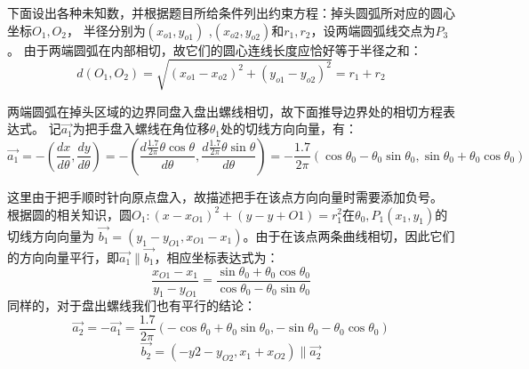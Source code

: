 \documentclass{cumcmthesis1}
\begin{document}
下面设出各种未知数，并根据题目所给条件列出约束方程：掉头圆弧所对应的圆心坐标$O_1,O_2$，
半径分别为$ (x_{o1},y_{o1})$ ,$ (x_{o2},y_{o2})$和$r_1,r_2$，设两端圆弧线交点为$P_3$。
由于两端圆弧在内部相切，故它们的圆心连线长度应恰好等于半径之和：
\begin{equation}
    d(O_1,O_2)=\sqrt{(x_{o1}-x_{o2})^2+(y_{o1}-y_{o2})^2}=r_1+r_2
    \label{eq:distance1}
\end{equation}
\par
两端圆弧在掉头区域的边界同盘入盘出螺线相切，故下面推导边界处的相切方程表达式。
记$\vec{a_1}$为把手盘入螺线在角位移$\theta_1$处的切线方向向量，有：
\begin{equation}
    \vec{a_1}=-(\frac{dx}{d \theta},\frac{dy}{d \theta})=-(\frac{d \frac{1.7}{2 \pi} \theta \cos \theta}{d \theta},\frac{d \frac{1.7}{2 \pi} \theta \sin \theta}{d \theta})
=-\frac{1.7}{ 2 \pi}(\cos \theta_0-\theta_0 \sin \theta_0,\sin \theta_0+\theta_0 \cos \theta_0)
\end{equation}
\par
这里由于把手顺时针向原点盘入，故描述把手在该点方向向量时需要添加负号。
根据圆的相关知识，圆$O_1: (x-x_{O1})^2+(y-y+{O1})=r_1^2$在$\theta_0,P_1(x_1,y_1)$的切线方向向量为
$\vec{b_1}=(y_1-y_{O1},x_{O1}-x_1)$。由于在该点两条曲线相切，因此它们的方向向量平行，即$\vec{a_1} \parallel \vec{b_1}$，相应坐标表达式为：
\begin{equation}
    \frac{x_{O1}-x_1}{y_1-y_{O1}}=\frac{\sin \theta_0+\theta_0 \cos \theta_0}{\cos \theta_0-\theta_0 \sin \theta_0}
    \label{eq:qiexian1}
\end{equation}
同样的，对于盘出螺线我们也有平行的结论：
\begin{equation}
    \vec{a_2}=-\vec{a_1}=\frac{1.7}{ 2 \pi}(-\cos \theta_0+\theta_0 \sin \theta_0,-\sin \theta_0-\theta_0 \cos \theta_0)
\end{equation}
\begin{equation}
   \vec{b_2}=(-y2-y_{O2},x_1+x_{O2}) \parallel \vec{a_2}
\end{equation}
\end{document}
